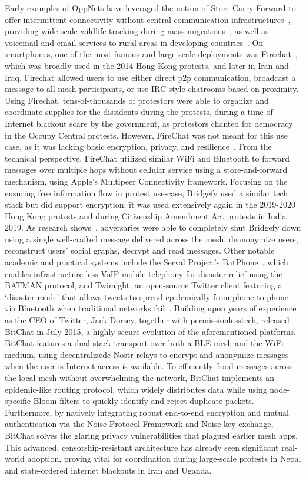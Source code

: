 Early examples of OppNets have leveraged the notion of Store-Carry-Forward to offer intermittent connectivity without central communication infrastructures~\cite{Juang2002}, providing wide-scale wildlife tracking during mass migrations~\cite{Pozza2015}, as well as voicemail and email services to rural areas in developing countries~\cite{Lindgren2007,Pentland2004}.
On smartphones, one of the most famous and large-scale deployments was Firechat~\cite{firechat1}, which was broadly used in the 2014 Hong Kong protests, and later in Iran and Iraq.
Firechat allowed users to use either direct p2p communication, broadcast a message to all mesh participants, or use IRC-style chatrooms based on proximity. Using Firechat, tens-of-thousands of protestors were able to organize and coordinate supplies for the dissidents during the protests, during a time of Internet blackout scare by the government, as protestors chanted for democracy in the Occupy Central protests.
However, FireChat was not meant for this use case, as it was lacking basic encryption, privacy, and resilience~\cite{firechat2}.
From the technical perspective, FireChat utilized similar WiFi and Bluetooth to forward messages over multiple hops without cellular service using a store-and-forward mechanism, using Apple's Multipeer Connectivity framework.
Focusing on the ensuring free information flow in protest use-case, Bridgefy used a similar tech stack but did support encryption: it was used extensively again in the 2019-2020 Hong Kong protests and during Citizenship Amendment Act protests in India 2019.
As research shows~\cite{Albrecht2021}, adversaries were able to completely shut Bridgefy down using a single well-crafted message delivered across the mesh, deanonymize users, reconstruct users' social graphs, decrypt and read messages.
Other notable academic and practical systems include the Serval Project's BatPhone~\cite{batphone}, which enables infrastructure-less VoIP mobile telephony for disaster relief using the BATMAN protocol, and Twimight, an open-source Twitter client featuring a `disaster mode' that allows tweets to spread epidemically from phone to phone via Bluetooth when traditional networks fail~\cite{Legendre2011}.
Building upon years of experience as the CEO of Twitter, Jack Dorsey, together with permissionlesstech, released BitChat in July 2015, a highly secure evolution of the aforementioned platforms. BitChat features a dual-stack transport over both a BLE mesh and the WiFi medium, using decentralizede Nostr relays to encrypt and anonymize messages when the user is Internet access is available.
To efficiently flood messages across the local mesh without overwhelming the network, BitChat implements an epidemic-like routing protocol, which widely distributes data while using node-specific Bloom filters to quickly identify and reject duplicate packets.
Furthermore, by natively integrating robust end-to-end encryption and mutual authentication via the Noise Protocol Framework and Noise key exchange, BitChat solves the glaring privacy vulnerabilities that plagued earlier mesh apps.
This advanced, censorship-resistant architecture has already seen significant real-world adoption, proving vital for coordination during large-scale protests in Nepal and state-ordered internet blackouts in Iran and Uganda.

